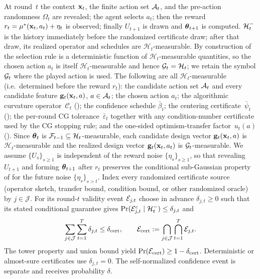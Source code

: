 \documentclass[twoside]{article}
\newcommand{\Calg}{\mathcal{C}}                 %
\newcommand{\cHist}{\mathcal{H}}                %
\begin{document}
At round~$t$ the context $\mathbf{x}_t$, the finite action set $\mathcal{A}_t$, and the
pre-action randomness $\Omega_t$ are revealed; the agent selects $a_t$; then the
reward $r_t=\mu^*(\mathbf{x}_t,a_t)+\eta_t$ is observed; finally $U_{t+1}$ is drawn and
$\boldsymbol{\theta}_{t+1}$ is computed.
$\mathcal{H}_t^-$ is the history immediately before the randomized certificate draw;
after that draw, its realized operator and schedules are $\cHist_t$-measurable.
By construction of  the selection rule is a deterministic function
of $\cHist_t$-measurable quantities, so the chosen action $a_t$ is itself
$\cHist_t$-measurable and hence $\cG_t=\cHist_t$; we retain the symbol $\mathcal{G}_t$
where the played action is used.
The following are all $\cHist_t$-measurable (i.e.\ determined before the reward
$r_t$): the candidate action set $\mathcal{A}_t$ and every candidate feature
$\mathbf{g}_t(\mathbf{x}_t,a)$, $a\in\mathcal{A}_t$; the chosen action $a_t$; the algorithmic
curvature operator~$\Calg_t$ (); the confidence schedule
$\bar\beta_t$; the centering certificate~$\bar\psi_t$
(); the per-round CG tolerance~$\bar\varepsilon_t$ together with
any condition-number certificate used by the CG stopping rule; and the one-sided
optimism-transfer factor~$u_t(a)$ ().
Since $\boldsymbol{\theta}_t$ is $\cF_{t-1}\subseteq\cHist_t$-measurable, each candidate design
vector $\mathbf{g}_t(\mathbf{x}_t,a)$ is $\cHist_t$-measurable and the realized design vector
$\mathbf{g}_t(\mathbf{x}_t,a_t)$ is $\mathcal{G}_t$-measurable.
We assume $\{U_s\}_{s\ge1}$ is independent of the reward noise
$\{\eta_s\}_{s\ge1}$, so that revealing $U_{t+1}$ and forming $\boldsymbol{\theta}_{t+1}$
after $r_t$ preserves the conditional sub-Gaussian property of 
for the future noise $\{\eta_s\}_{s>t}$.
Index every randomized certificate source (operator sketch, transfer bound,
condition bound, or other randomized oracle) by $j\in\mathcal J$.  For its
round-$t$ validity event $\mathcal{E}_{j,t}$ choose in advance
$\delta_{j,t}\ge0$ such that its stated conditional guarantee gives
$\Pr(\mathcal{E}_{j,t}^c\mid\mathcal{H}_t^-)\le\delta_{j,t}$ and
\[
 \sum_{j\in\mathcal J}\sum_{t=1}^T\delta_{j,t}
 \le\delta_{\rm cert},\qquad
 \mathcal{E}_{\rm cert}:=\bigcap_{j\in\mathcal J}\bigcap_{t=1}^T\mathcal{E}_{j,t}.
\]
The tower property and union bound yield
$\Pr(\mathcal{E}_{\rm cert})\ge1-\delta_{\rm cert}$.  Deterministic or almost-sure
certificates use $\delta_{j,t}=0$.  The self-normalized confidence event is
separate and receives probability $\delta$.
\end{document}
